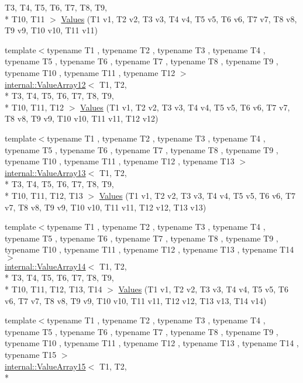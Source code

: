 \begin{DoxyCompactItemize}
T3, T4, T5, T6, T7, T8, T9, \\*
T10, T11 $>$ \hyperlink{namespacetesting_a4aaae77b8404038ed5f3bf56cccdb940}{Values} (T1 v1, T2 v2, T3 v3, T4 v4, T5 v5, T6 v6, T7 v7, T8 v8, T9 v9, T10 v10, T11 v11)
\item 
{\footnotesize template$<$typename T1 , typename T2 , typename T3 , typename T4 , typename T5 , typename T6 , typename T7 , typename T8 , typename T9 , typename T10 , typename T11 , typename T12 $>$ }\\\hyperlink{classtesting_1_1internal_1_1_value_array12}{internal\-::\-Value\-Array12}$<$ T1, T2, \\*
T3, T4, T5, T6, T7, T8, T9, \\*
T10, T11, T12 $>$ \hyperlink{namespacetesting_a03e7f9611794732bb030c53365dc6c86}{Values} (T1 v1, T2 v2, T3 v3, T4 v4, T5 v5, T6 v6, T7 v7, T8 v8, T9 v9, T10 v10, T11 v11, T12 v12)
\item 
{\footnotesize template$<$typename T1 , typename T2 , typename T3 , typename T4 , typename T5 , typename T6 , typename T7 , typename T8 , typename T9 , typename T10 , typename T11 , typename T12 , typename T13 $>$ }\\\hyperlink{classtesting_1_1internal_1_1_value_array13}{internal\-::\-Value\-Array13}$<$ T1, T2, \\*
T3, T4, T5, T6, T7, T8, T9, \\*
T10, T11, T12, T13 $>$ \hyperlink{namespacetesting_aa13a09e043383c947042ba726d25d47c}{Values} (T1 v1, T2 v2, T3 v3, T4 v4, T5 v5, T6 v6, T7 v7, T8 v8, T9 v9, T10 v10, T11 v11, T12 v12, T13 v13)
\item 
{\footnotesize template$<$typename T1 , typename T2 , typename T3 , typename T4 , typename T5 , typename T6 , typename T7 , typename T8 , typename T9 , typename T10 , typename T11 , typename T12 , typename T13 , typename T14 $>$ }\\\hyperlink{classtesting_1_1internal_1_1_value_array14}{internal\-::\-Value\-Array14}$<$ T1, T2, \\*
T3, T4, T5, T6, T7, T8, T9, \\*
T10, T11, T12, T13, T14 $>$ \hyperlink{namespacetesting_a2d00ed785e0e796e6f36dc79c051dc76}{Values} (T1 v1, T2 v2, T3 v3, T4 v4, T5 v5, T6 v6, T7 v7, T8 v8, T9 v9, T10 v10, T11 v11, T12 v12, T13 v13, T14 v14)
\item 
{\footnotesize template$<$typename T1 , typename T2 , typename T3 , typename T4 , typename T5 , typename T6 , typename T7 , typename T8 , typename T9 , typename T10 , typename T11 , typename T12 , typename T13 , typename T14 , typename T15 $>$ }\\\hyperlink{classtesting_1_1internal_1_1_value_array15}{internal\-::\-Value\-Array15}$<$ T1, T2, \\*

\end{DoxyCompactItemize}

